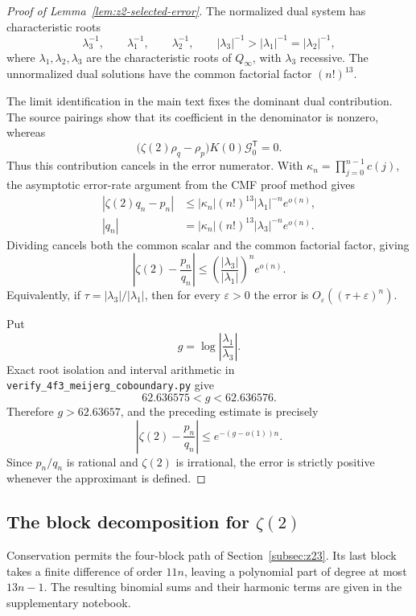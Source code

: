 \documentclass[oneside,english,11pt]{amsart}
\begin{document}
\begin{proof}[Proof of Lemma~\ref{lem:z2-selected-error}]
\label{app:z2-error}
The normalized dual system has characteristic roots
\[
\lambda_3^{-1},\qquad\lambda_1^{-1},\qquad\lambda_2^{-1},
\qquad |\lambda_3|^{-1}>|\lambda_1|^{-1}=|\lambda_2|^{-1},
\]
where $\lambda_1,\lambda_2,\lambda_3$ are the characteristic roots
of $Q_\infty$, with $\lambda_3$ recessive. The unnormalized dual
solutions have the common factorial factor $(n!)^{13}$.

The limit identification in the main text fixes the dominant dual
contribution. The source pairings show that its coefficient in the
denominator is nonzero, whereas
\[
\bigl(\zeta(2)\rho_q-\rho_p\bigr)K(0)\mathcal G_0^{\mathsf T}=0.
\]
Thus this contribution cancels in the error numerator.
With $\kappa_n=\prod_{j=0}^{n-1}c(j)$, the asymptotic error-rate
argument from the CMF proof method gives
\[
\begin{aligned}
|\zeta(2)q_n-p_n|
&\leq|\kappa_n|(n!)^{13}|\lambda_1|^{-n}e^{o(n)},\\
|q_n|&=|\kappa_n|(n!)^{13}|\lambda_3|^{-n}e^{o(n)}.
\end{aligned}
\]
Dividing cancels both the common scalar and the common factorial
factor, giving
\[
\left|\zeta(2)-\frac{p_n}{q_n}\right|
\leq\left(\frac{|\lambda_3|}{|\lambda_1|}\right)^n e^{o(n)}.
\]
Equivalently, if $\tau=|\lambda_3|/|\lambda_1|$, then for every
$\varepsilon>0$ the error is $O_\varepsilon((\tau+\varepsilon)^n)$.

Put
\[
g=\log\left|\frac{\lambda_1}{\lambda_3}\right|.
\]
Exact root isolation and interval arithmetic in
\texttt{verify\_4f3\_meijerg\_coboundary.py} give
\[
62.636575<g<62.636576.
\]
Therefore $g>62.63657$, and the preceding estimate is precisely
\[
\left|\zeta(2)-\frac{p_n}{q_n}\right|
\leq e^{-(g-o(1))n}.
\]
Since $p_n/q_n$ is rational and $\zeta(2)$ is irrational, the error
is strictly positive whenever the approximant is defined.
\end{proof}


\subsection{The block decomposition for \texorpdfstring{$\zeta(2)$}{zeta(2)}}
\label{app:z2-blocks}

Conservation permits the four-block path of
Section~\ref{subsec:z23}. Its last block takes a finite
difference of order $11n$, leaving a polynomial part of degree at most
$13n-1$. The resulting binomial sums and their harmonic terms are given
in the supplementary notebook.
\end{document}
